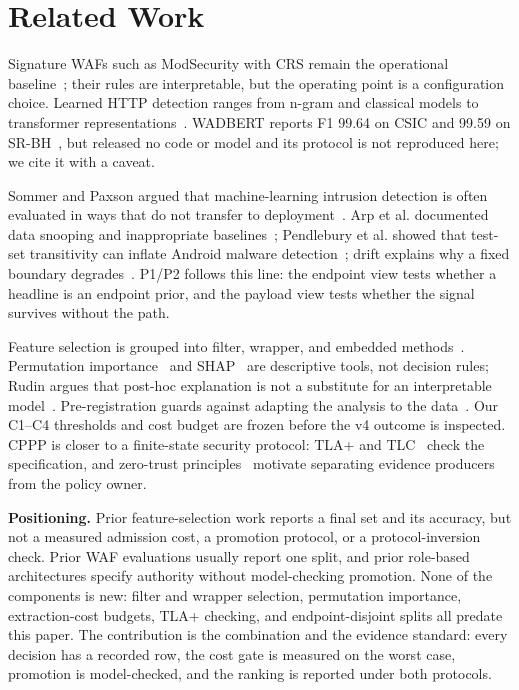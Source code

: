 \documentclass[conference]{IEEEtran}
\begin{document}
\section{Related Work}
Signature WAFs such as ModSecurity with CRS remain the operational baseline~\cite{ristic2010modsecurity,owasp_crs}; their rules are interpretable, but the operating point is a configuration choice. Learned HTTP detection ranges from n-gram and classical models to transformer representations~\cite{kruegel2003anomaly,robertson2006behavior,garcia2009anomaly,torrano2010anomaly,sureda2022new,luo2026wadbert}. WADBERT reports F1 99.64 on CSIC and 99.59 on SR-BH~\cite{luo2026wadbert}, but released no code or model and its protocol is not reproduced here; we cite it with a caveat.

Sommer and Paxson argued that machine-learning intrusion detection is often evaluated in ways that do not transfer to deployment~\cite{sommer2010outside}. Arp et al. documented data snooping and inappropriate baselines~\cite{arp2022dos}; Pendlebury et al. showed that test-set transitivity can inflate Android malware detection~\cite{pendlebury2019tesseract}; drift explains why a fixed boundary degrades~\cite{gama2014survey}. P1/P2 follows this line: the endpoint view tests whether a headline is an endpoint prior, and the payload view tests whether the signal survives without the path.

Feature selection is grouped into filter, wrapper, and embedded methods~\cite{guyon2003introduction}. Permutation importance~\cite{breiman2001random} and SHAP~\cite{lundberg2017unified} are descriptive tools, not decision rules; Rudin argues that post-hoc explanation is not a substitute for an interpretable model~\cite{rudin2019stop}. Pre-registration guards against adapting the analysis to the data~\cite{nosek2018preregistration}. Our C1--C4 thresholds and cost budget are frozen before the v4 outcome is inspected. CPPP is closer to a finite-state security protocol: TLA+ and TLC~\cite{lamport2002specifying,clarke2009model} check the specification, and zero-trust principles~\cite{nist2020zero} motivate separating evidence producers from the policy owner.

\textbf{Positioning.} Prior feature-selection work reports a final set and its accuracy, but not a measured admission cost, a promotion protocol, or a protocol-inversion check. Prior WAF evaluations usually report one split, and prior role-based architectures specify authority without model-checking promotion. None of the components is new: filter and wrapper selection, permutation importance, extraction-cost budgets, TLA+ checking, and endpoint-disjoint splits all predate this paper. The contribution is the combination and the evidence standard: every decision has a recorded row, the cost gate is measured on the worst case, promotion is model-checked, and the ranking is reported under both protocols.
\end{document}
